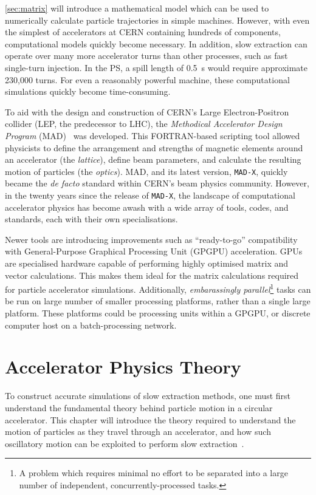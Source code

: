 \documentclass[11pt]{report}
\begin{document}
\autoref{sec:matrix} will introduce a mathematical model which can be used to numerically calculate particle trajectories in simple machines. However, with even the simplest of accelerators at CERN containing hundreds of components, computational models quickly become necessary. In addition, slow extraction can operate over many more accelerator turns than other processes, such as fast single-turn injection. In the PS, a spill length of \qty{0.5}{\second} would require approximate 230,000 turns. For even a reasonably powerful machine, these computational simulations quickly become time-consuming. 

To aid with the design and construction of CERN's Large Electron-Positron collider (LEP, the predecessor to LHC), the \textit{Methodical Accelerator Design Program} (MAD)~\cite{Iselin:MAD} was developed. This FORTRAN-based scripting tool allowed physicists to define the arrangement and strengths of magnetic elements around an accelerator (the \textit{lattice}), define beam parameters, and calculate the resulting motion of particles (the \textit{optics}). MAD, and its latest version, \verb|MAD-X|, quickly became the \textit{de facto} standard within CERN's beam physics community. However, in the twenty years since the release of \verb|MAD-X|, the landscape of computational accelerator physics has become awash with a wide array of tools, codes, and standards, each with their own specialisations. 

Newer tools are introducing improvements such as ``ready-to-go'' compatibility with General-Purpose Graphical Processing Unit (GPGPU) acceleration. GPUs are specialised hardware capable of performing highly optimised matrix and vector calculations. This makes them ideal for the matrix calculations required for particle accelerator simulations. Additionally, \textit{embarassingly parallel}\footnote{A problem which requires minimal no effort to be separated into a large number of independent, concurrently-processed tasks.} tasks can be run on large number of smaller processing platforms, rather than a single large platform. These platforms could be processing units within a GPGPU, or discrete computer host on a batch-processing network.

\chapter{Accelerator Physics Theory}\label{chap:theory}

To construct accurate simulations of slow extraction methods, one must first understand the fundamental theory behind particle motion in a circular accelerator. This chapter will introduce the theory required to understand the motion of particles as they travel through an accelerator, and how such oscillatory motion can be exploited to perform slow extraction~\cite{Wiedemann}.
\end{document}
